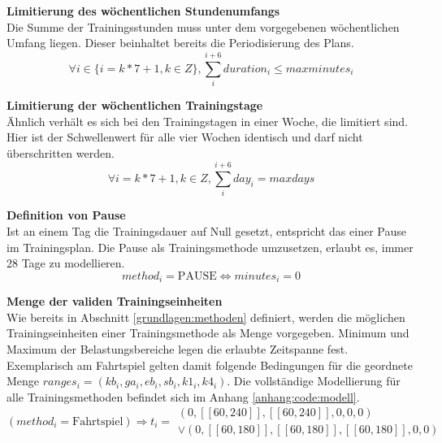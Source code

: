 \textbf{Limitierung des wöchentlichen Stundenumfangs} \\[0.2em]
Die Summe der Trainingsstunden muss unter dem vorgegebenen wöchentlichen Umfang liegen. Dieser beinhaltet bereits die Periodisierung des Plans.
\begin{equation}
    \forall i \in \{ i = k * 7 + 1, k \in Z \}, \sum_{i}^{i+6} duration_i \leq maxminutes_i
\end{equation}

\textbf{Limitierung der wöchentlichen Trainingstage} \\[0.2em]
Ähnlich verhält es sich bei den Trainingstagen in einer Woche, die limitiert sind. Hier ist der Schwellenwert für alle vier Wochen identisch und darf nicht überschritten werden.
\begin{equation}
    \forall i = k * 7 + 1, k \in Z, \sum_{i}^{i+6} day_i = maxdays
\end{equation}

\textbf{Definition von Pause} \\[0.2em]
Ist an einem Tag die Trainingsdauer auf Null gesetzt, entspricht das einer Pause im Trainingsplan. Die Pause als Trainingsmethode umzusetzen, erlaubt es, immer 28 Tage zu modellieren.
\begin{equation}
    method_i = \text{PAUSE} \Leftrightarrow minutes_i = 0
\end{equation}

\textbf{Menge der validen Trainingseinheiten} \\[0.2em]
Wie bereits in Abschnitt \ref{grundlagen:methoden} definiert, werden die möglichen Trainingseinheiten einer Trainingsmethode als Menge vorgegeben. Minimum und Maximum der Belastungsbereiche legen die erlaubte Zeitspanne fest. Exemplarisch am Fahrtspiel gelten damit folgende Bedingungen für die geordnete Menge $ranges_i = (kb_i, ga_i, eb_i, sb_i, k1_i, k4_i)$. Die vollständige Modellierung für alle Trainingsmethoden befindet sich im Anhang \ref{anhang:code:modell}.
\begin{equation}
    (method_i = \text{Fahrtspiel})\Rightarrow t_i = \begin{array}{c}
            (0, [\![60, 240]\!], [\![60, 240]\!], 0, 0, 0) \\ 
        \vee (0, [\![60,180]\!], [\![60, 180]\!], [\![60, 180]\!], 0, 0)
    \end{array}
\end{equation}



